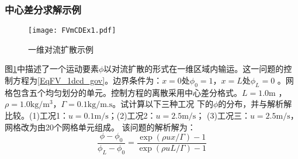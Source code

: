 \subsubsection{中心差分求解示例}
\begin{figure}[h]
  \centering
  \texttt{[image: FVmCDEx1.pdf]}
  \caption{一维对流扩散示例}
  \label{FgFV_cd_ex1}
\end{figure}
图\ref{FgFV_cd_ex1}中描述了一个运动要素$\phi$以对流扩散的形式在一维区域内输运。这一问题的控
制方程为\eqref{EqFV_1dcd_gov}。边界条件为：$x=0$处$\phi_{0}=1$，$x=L$处$\phi_{L}=0$
。网格包含五个均匀划分的单元。控制方程的离散采用中心差分格式。$L=1.0\mathrm{m}$
，$\rho=1.0\mathrm{kg/m^{3}}$，$\Gamma=0.1\mathrm{kg/m.s}$。试计算以下三种工况
下的$\phi$的分布，并与解析解比较。(1)工况1：$u=0.1\mathrm{m/s}$；(2)工况2：$u=2.5\mathrm{m/s}$；
(3)工况三：$u=2.5\mathrm{m/s}$，网格改为由20个网格单元组成。
该问题的解析解为：
\begin{equation}
  \frac{\phi-\phi_{0}}{\phi_{L}-\phi_{0}}
  =
  \frac{\exp(\rho ux/\Gamma)-1}{\exp(\rho uL/\Gamma)-1}
\end{equation}

